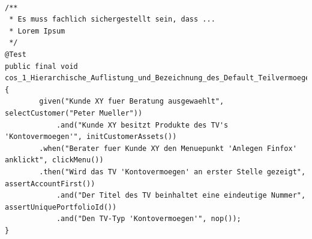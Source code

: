 \begin{lstlisting}[caption={In den Kommentaren kann die CoS als Prosa-Text erklärt werden. Der Methodenname entspricht einer eindeutigen Identifizierung für die CoS. Zentral sind die klar verständlichen Aufrufe an \textit{given}, \textit{when} und \textit{then}. Jeweils das zweite Argument innerhalb dieser Aufrufe entspricht einer Methode der Testing API (siehe Abschnitt \ref{sec:testing_api})},label=lst:shortcode]

/**
 * Es muss fachlich sichergestellt sein, dass ...
 * Lorem Ipsum
 */
@Test
public final void cos_1_Hierarchische_Auflistung_und_Bezeichnung_des_Default_Teilvermoegens_Kontovermoegen() {
		given("Kunde XY fuer Beratung ausgewaehlt", selectCustomer("Peter Mueller"))
			.and("Kunde XY besitzt Produkte des TV's 'Kontovermoegen'", initCustomerAssets())
		.when("Berater fuer Kunde XY den Menuepunkt 'Anlegen Finfox' anklickt", clickMenu())
		.then("Wird das TV 'Kontovermoegen' an erster Stelle gezeigt", assertAccountFirst())
			.and("Der Titel des TV beinhaltet eine eindeutige Nummer", assertUniquePortfolioId())
			.and("Den TV-Typ 'Kontovermoegen'", nop());
}
\end{lstlisting}


